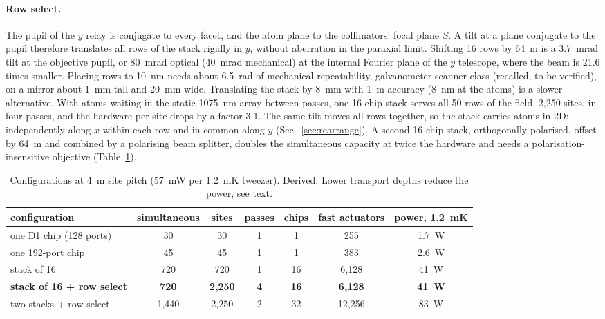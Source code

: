 \paragraph{Row select.} The pupil of the $y$ relay is conjugate to every facet, and the atom plane to the
collimators' focal plane $S$. A tilt at a plane conjugate to the pupil therefore translates all rows of the
stack rigidly in $y$, without aberration in the paraxial limit. Shifting 16 rows by 64~\textmu m is a 3.7~mrad
tilt at the objective pupil, or 80~mrad optical (40~mrad mechanical) at the internal Fourier plane of the $y$
telescope, where the beam is 21.6 times smaller. Placing rows to 10~nm needs about 6.5~\textmu rad of mechanical
repeatability, galvanometer-scanner class (recalled, to be verified), on a mirror about 1~mm tall and 20~mm wide.
Translating the stack by 8~mm with 1~\textmu m accuracy (8~nm at the atoms) is a slower alternative. With atoms
waiting in the static 1075~nm array between passes, one 16-chip stack serves all 50 rows of the field, 2,250
sites, in four passes, and the hardware per site drops by a factor 3.1. The same tilt moves all rows together,
so the stack carries atoms in 2D: independently along $x$ within each row and in common along $y$
(Sec.~\ref{sec:rearrange}). A second 16-chip stack, orthogonally polarised, offset by 64~\textmu m and combined
by a polarising beam splitter, doubles the simultaneous capacity at twice the hardware and needs a
polarisation-insensitive objective (Table~\ref{tab:more-config}).

\begin{table}[htbp]\centering\small
\caption{Configurations at 4~\textmu m site pitch (57~mW per 1.2~mK tweezer). Derived. Lower transport depths
reduce the power, see text.}
\label{tab:more-config}
\setlength{\tabcolsep}{4pt}
\begin{tabular}{lcccccc}
\toprule
configuration & simultaneous & sites & passes & chips & fast actuators & power, 1.2~mK \\
\midrule
one D1 chip (128 ports) & 30 & 30 & 1 & 1 & 255 & 1.7~W \\
one 192-port chip & 45 & 45 & 1 & 1 & 383 & 2.6~W \\
stack of 16 & 720 & 720 & 1 & 16 & 6,128 & 41~W \\
\textbf{stack of 16 + row select} & \textbf{720} & \textbf{2,250} & \textbf{4} & \textbf{16} & \textbf{6,128} & \textbf{41~W} \\
two stacks + row select & 1,440 & 2,250 & 2 & 32 & 12,256 & 83~W \\
\bottomrule
\end{tabular}
\end{table}

